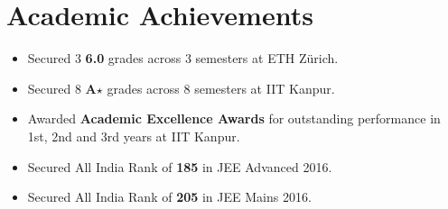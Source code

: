 \section*{Academic Achievements}
\begin{itemize}[itemsep=0mm]

\item Secured 3 \textbf{6.0} grades across 3 semesters at ETH Zürich.
\item Secured 8 \textbf{A$\star$} grades across 8 semesters at IIT Kanpur.
\item Awarded \textbf{Academic Excellence Awards} for outstanding performance in 1st, 2nd and 3rd years at IIT Kanpur.
\item Secured All India Rank of \textbf{185} in JEE Advanced 2016.
\item Secured All India Rank of \textbf{205} in JEE Mains 2016.

\end{itemize}
